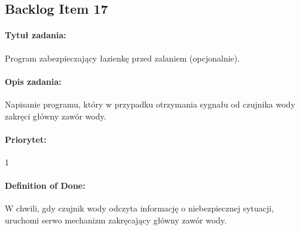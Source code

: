 
	\subsection{Backlog Item 17}
	\paragraph{Tytuł zadania:}
	Program zabezpieczający łazienkę przed zalaniem (opcjonalnie).
	
	\paragraph{Opis zadania:} 
	Napisanie programu, który w przypadku otrzymania sygnału od czujnika wody zakręci główny zawór wody. 
	
	\paragraph{Priorytet:} 
	1
	
	\paragraph{Definition of Done:}
	W chwili, gdy czujnik wody odczyta informację o niebezpiecznej sytuacji, uruchomi serwo mechanizm zakręcający główny zawór wody.


	
